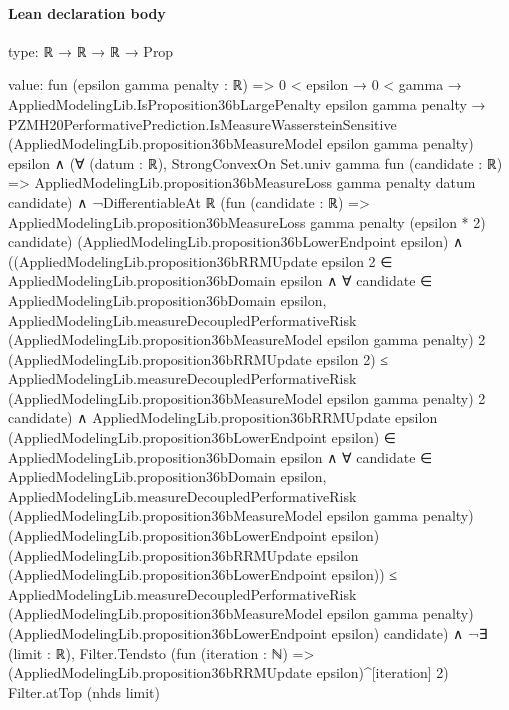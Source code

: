 \documentclass[10pt]{article}
\begin{document}
\paragraph{Lean declaration body}
\begin{ReviewVerbatim}
type:
ℝ → ℝ → ℝ → Prop

value:
fun (epsilon gamma penalty : ℝ) =>
  0 < epsilon →
    0 < gamma →
      AppliedModelingLib.IsProposition36bLargePenalty epsilon gamma penalty →
        PZMH20PerformativePrediction.IsMeasureWassersteinSensitive
            (AppliedModelingLib.proposition36bMeasureModel epsilon gamma penalty) epsilon ∧
          (∀ (datum : ℝ),
              StrongConvexOn Set.univ gamma fun (candidate : ℝ) =>
                AppliedModelingLib.proposition36bMeasureLoss gamma penalty datum candidate) ∧
            ¬DifferentiableAt ℝ
                  (fun (candidate : ℝ) =>
                    AppliedModelingLib.proposition36bMeasureLoss gamma penalty (epsilon * 2) candidate)
                  (AppliedModelingLib.proposition36bLowerEndpoint epsilon) ∧
              ((AppliedModelingLib.proposition36bRRMUpdate epsilon 2 ∈ AppliedModelingLib.proposition36bDomain epsilon ∧
                    ∀ candidate ∈ AppliedModelingLib.proposition36bDomain epsilon,
                      AppliedModelingLib.measureDecoupledPerformativeRisk
                          (AppliedModelingLib.proposition36bMeasureModel epsilon gamma penalty) 2
                          (AppliedModelingLib.proposition36bRRMUpdate epsilon 2) ≤
                        AppliedModelingLib.measureDecoupledPerformativeRisk
                          (AppliedModelingLib.proposition36bMeasureModel epsilon gamma penalty) 2 candidate) ∧
                  AppliedModelingLib.proposition36bRRMUpdate epsilon
                        (AppliedModelingLib.proposition36bLowerEndpoint epsilon) ∈
                      AppliedModelingLib.proposition36bDomain epsilon ∧
                    ∀ candidate ∈ AppliedModelingLib.proposition36bDomain epsilon,
                      AppliedModelingLib.measureDecoupledPerformativeRisk
                          (AppliedModelingLib.proposition36bMeasureModel epsilon gamma penalty)
                          (AppliedModelingLib.proposition36bLowerEndpoint epsilon)
                          (AppliedModelingLib.proposition36bRRMUpdate epsilon
                            (AppliedModelingLib.proposition36bLowerEndpoint epsilon)) ≤
                        AppliedModelingLib.measureDecoupledPerformativeRisk
                          (AppliedModelingLib.proposition36bMeasureModel epsilon gamma penalty)
                          (AppliedModelingLib.proposition36bLowerEndpoint epsilon) candidate) ∧
                ¬∃ (limit : ℝ),
                    Filter.Tendsto
                      (fun (iteration : ℕ) => (AppliedModelingLib.proposition36bRRMUpdate epsilon)^[iteration] 2)
                      Filter.atTop (nhds limit)
\end{ReviewVerbatim}
\end{document}
